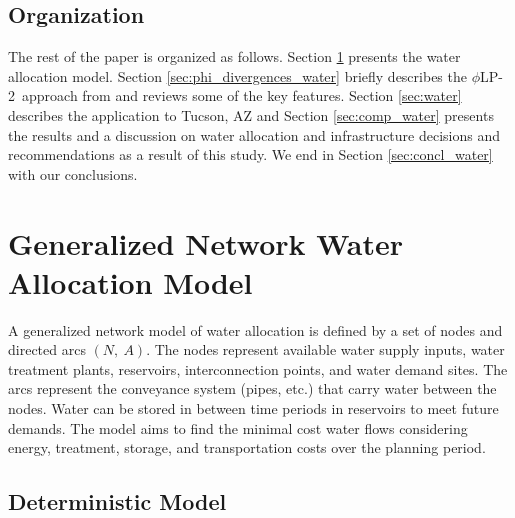 \documentclass[11pt]{article}
\theoremstyle{plain}
\theoremstyle{definition}
\theoremstyle{remark}
\newcommand{\plp}{$\phi$LP-2}
\begin{document}
\subsection{Organization}

The rest of the paper is organized as follows.
Section \ref{sec:network_model} presents the water allocation model.
Section \ref{sec:phi_divergences_water} briefly describes the \plp\ approach from \citep{love2013phi} and reviews some of the key features.
Section \ref{sec:water} describes the application to Tucson, AZ and Section \ref{sec:comp_water} presents the results and a discussion on water allocation and infrastructure decisions and recommendations as a result of this study.
We end in Section \ref{sec:concl_water} with our conclusions.



\section{Generalized Network Water Allocation Model}
\label{sec:network_model}

A generalized network model of water allocation is defined by a set of nodes and directed arcs $(N,\: A)$.
The nodes represent available water supply inputs, water treatment plants, reservoirs, interconnection points, and water demand sites.
The arcs represent the conveyance system (pipes, etc.) that carry water between the nodes.
Water can be stored in between time periods in reservoirs to meet future demands.
The model aims to find the minimal cost water flows considering energy, treatment, storage, and transportation costs over the planning period.

\subsection{Deterministic Model}
\end{document}
